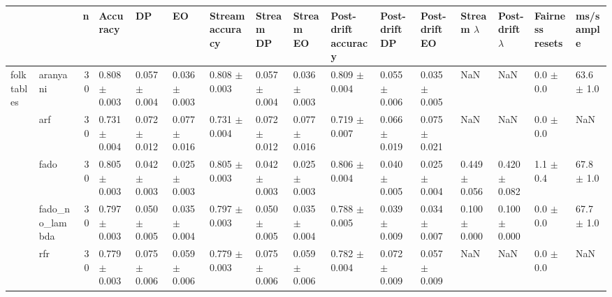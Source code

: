 \begin{tabular}{llrlllllllllllll}
\toprule
 &  & n & Accuracy & DP & EO & Stream accuracy & Stream DP & Stream EO & Post-drift accuracy & Post-drift DP & Post-drift EO & Stream $\lambda$ & Post-drift $\lambda$ & Fairness resets & ms/sample \\
\midrule
\multirow[t]{5}{*}{folktables} & aranyani & 30 & 0.808 $\pm$ 0.003 & 0.057 $\pm$ 0.004 & 0.036 $\pm$ 0.003 & 0.808 $\pm$ 0.003 & 0.057 $\pm$ 0.004 & 0.036 $\pm$ 0.003 & 0.809 $\pm$ 0.004 & 0.055 $\pm$ 0.006 & 0.035 $\pm$ 0.005 & NaN & NaN & 0.0 $\pm$ 0.0 & 63.6 $\pm$ 1.0 \\
 & arf & 30 & 0.731 $\pm$ 0.004 & 0.072 $\pm$ 0.012 & 0.077 $\pm$ 0.016 & 0.731 $\pm$ 0.004 & 0.072 $\pm$ 0.012 & 0.077 $\pm$ 0.016 & 0.719 $\pm$ 0.007 & 0.066 $\pm$ 0.019 & 0.075 $\pm$ 0.021 & NaN & NaN & 0.0 $\pm$ 0.0 & NaN \\
 & fado & 30 & 0.805 $\pm$ 0.003 & 0.042 $\pm$ 0.003 & 0.025 $\pm$ 0.003 & 0.805 $\pm$ 0.003 & 0.042 $\pm$ 0.003 & 0.025 $\pm$ 0.003 & 0.806 $\pm$ 0.004 & 0.040 $\pm$ 0.005 & 0.025 $\pm$ 0.004 & 0.449 $\pm$ 0.056 & 0.420 $\pm$ 0.082 & 1.1 $\pm$ 0.4 & 67.8 $\pm$ 1.0 \\
 & fado\_no\_lambda & 30 & 0.797 $\pm$ 0.003 & 0.050 $\pm$ 0.005 & 0.035 $\pm$ 0.004 & 0.797 $\pm$ 0.003 & 0.050 $\pm$ 0.005 & 0.035 $\pm$ 0.004 & 0.788 $\pm$ 0.005 & 0.039 $\pm$ 0.009 & 0.034 $\pm$ 0.007 & 0.100 $\pm$ 0.000 & 0.100 $\pm$ 0.000 & 0.0 $\pm$ 0.0 & 67.7 $\pm$ 1.0 \\
 & rfr & 30 & 0.779 $\pm$ 0.003 & 0.075 $\pm$ 0.006 & 0.059 $\pm$ 0.006 & 0.779 $\pm$ 0.003 & 0.075 $\pm$ 0.006 & 0.059 $\pm$ 0.006 & 0.782 $\pm$ 0.004 & 0.072 $\pm$ 0.009 & 0.057 $\pm$ 0.009 & NaN & NaN & 0.0 $\pm$ 0.0 & NaN \\
\cline{1-16}
\bottomrule
\end{tabular}
